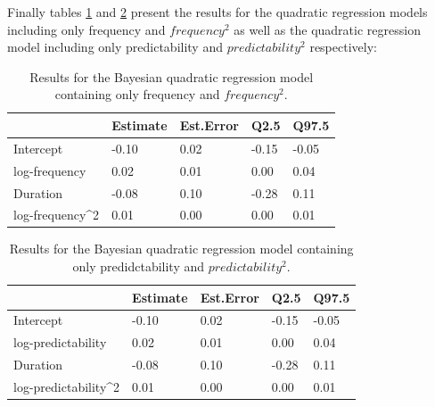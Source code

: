 \documentclass[
  man,floatsintext]{apa6}
\begin{document}
Finally tables \ref{tab:brmsFreq} and \ref{tab:brmsPredic} present the results for the quadratic regression models including only frequency and \(frequency^2\) as well as the quadratic regression model including only predictability and \(predictability^2\) respectively:



\begin{table}[H]

\begin{center}
\begin{threeparttable}

\caption{\label{tab:brmsFreq}Results for the Bayesian quadratic regression model containing only frequency and \(frequency^2\).}

\begin{tabular}{lllll}
\toprule
 & \multicolumn{1}{c}{Estimate} & \multicolumn{1}{c}{Est.Error} & \multicolumn{1}{c}{Q2.5} & \multicolumn{1}{c}{Q97.5}\\
\midrule
Intercept & -0.10 & 0.02 & -0.15 & -0.05\\
log-frequency & 0.02 & 0.01 & 0.00 & 0.04\\
Duration & -0.08 & 0.10 & -0.28 & 0.11\\
log-frequency\textasciicircum{}2 & 0.01 & 0.00 & 0.00 & 0.01\\
\bottomrule
\end{tabular}

\end{threeparttable}
\end{center}

\end{table}



\begin{table}[H]

\begin{center}
\begin{threeparttable}

\caption{\label{tab:brmsPredic}Results for the Bayesian quadratic regression model containing only predidctability and \(predictability^2\).}

\begin{tabular}{lllll}
\toprule
 & \multicolumn{1}{c}{Estimate} & \multicolumn{1}{c}{Est.Error} & \multicolumn{1}{c}{Q2.5} & \multicolumn{1}{c}{Q97.5}\\
\midrule
Intercept & -0.10 & 0.02 & -0.15 & -0.05\\
log-predictability & 0.02 & 0.01 & 0.00 & 0.04\\
Duration & -0.08 & 0.10 & -0.28 & 0.11\\
log-predictability\textasciicircum{}2 & 0.01 & 0.00 & 0.00 & 0.01\\
\bottomrule
\end{tabular}

\end{threeparttable}
\end{center}

\end{table}
\end{document}
